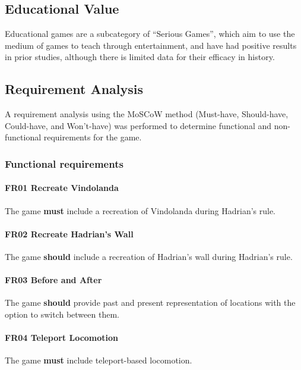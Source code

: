 \documentclass[sigconf,authordraft]{acmart}
\begin{document}
\subsection{Educational Value}
Educational games are a subcategory of ``Serious Games'', which aim to use the
medium of games to teach through entertainment, and have had positive results in
prior studies, although there is limited data for their efficacy in history.
\cite{backlund_educational_2013}

\subsection{Requirement Analysis}

A requirement analysis using the MoSCoW method (Must-have, Should-have,
Could-have, and Won't-have) was performed to determine functional and
non-functional requirements for the game.

\subsubsection{Functional requirements}

\paragraph{FR01 Recreate Vindolanda}
The game \textbf{must} include a recreation of Vindolanda during Hadrian's
rule.

\paragraph{FR02 Recreate Hadrian's Wall}
The game \textbf{should} include a recreation of Hadrian's wall during Hadrian's
rule.

\paragraph{FR03 Before and After}
The game \textbf{should} provide past and present representation of locations
with the option to switch between them.

\paragraph{FR04 Teleport Locomotion}
The game \textbf{must} include teleport-based locomotion.
\end{document}

